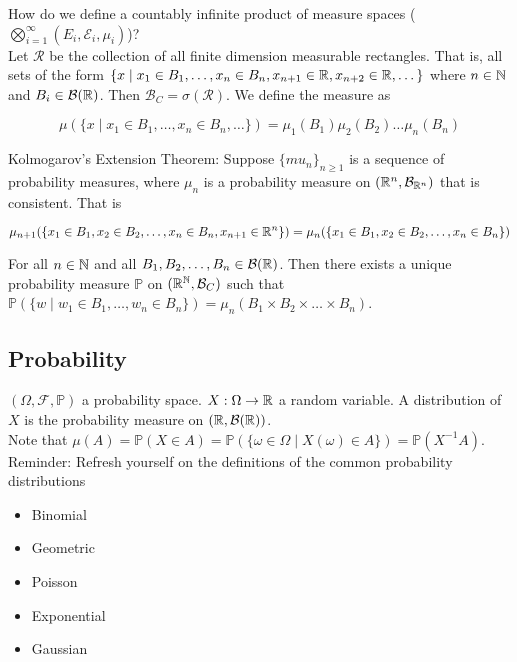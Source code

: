 \documentclass[english, course]{Notes}
\begin{document}
How do we define a countably infinite product of measure spaces ($\bigotimes_{i = 1}^\infty (E_i, \mathcal{E}_i, \mu_i)$)?\\

Let $\mathcal{R}$ be the collection of all finite dimension measurable rectangles. That is, all sets of the form $\{ x \mid x_1 \in B_1, \dots, x_n \in B_n, x_{n + 1} \in \mathbb{R}, x_{n + 2} \in \mathbb{R}, \dots \}$ where $n \in \mathbb{N}$ and $B_i \in \mathcal{B}(\mathbb{R})$. Then $\mathcal{B}_C = \sigma(\mathcal{R})$. We define the measure as

\[\mu(\{x \mid x_1 \in B_1, \dots, x_n \in B_n, \dots\}) = \mu_1(B_1)\mu_2(B_2)\dots\mu_n(B_n)\] 

\begin{theorem}
Kolmogarov's Extension Theorem: Suppose $\{mu_n\}_{n \geq 1}$ is a sequence of probability measures, where $\mu_n$ is a probability measure on $(\mathbb{R}^n, \mathcal{B}_{\mathbb{R}^n})$ that is consistent. That is

\[\mu_{n + 1}(\{x_1 \in B_1, x_2 \in B_2, \dots, x_n \in B_n, x_{n+1} \in \mathbb{R}^n\}) = \mu_n(\{x_1 \in B_1, x_2 \in B_2, \dots, x_n \in B_n \})\]

For all $n \in \mathbb{N}$ and all $B_1, B_2, \dots, B_n \in \mathcal{B}(\mathbb{R})$. Then there exists a unique probability measure $\mathbb{P}$ on $(\mathbb{R}^{\mathbb{N}}, \mathcal{B}_C)$ such that $\mathbb{P}(\{w \mid w_1 \in B_1, \dots, w_n \in B_n\}) = \mu_n(B_1 \times B_2 \times \dots \times B_n)$.
\end{theorem}
\subsection{Probability}
$(\Omega, \mathcal{F}, \mathbb{P})$ a probability space. $X: \Omega \to \mathbb{R}$ a random variable. A distribution of $X$ is the probability measure on $(\mathbb{R}, \mathcal{B}(\mathbb{R}))$.\\

Note that $\mu(A) = \mathbb{P}(X \in A) = \mathbb{P}(\{\omega \in \Omega \mid X(\omega) \in A \}) = \mathbb{P}(X^{-1}A)$.\\

Reminder: Refresh yourself on the definitions of the common probability distributions

\begin{itemize}
	\item Binomial
	\item Geometric
	\item Poisson
	\item Exponential
	\item Gaussian
\end{itemize}
\end{document}
